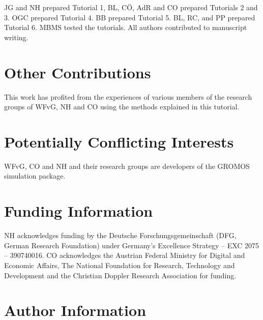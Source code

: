 \documentclass[9pt,tutorial,pubversion]{../includes/livecoms}
\newcommand{\githubrepository}{\url{https://github.com/biomos/gromos_tutorial_livecoms}}  %
\begin{document}
JG and NH prepared Tutorial 1, BL, C\"O, AdR and CO prepared Tutorials 2 and 3. OGC prepared Tutorial 4. BB prepared Tutorial 5. BL, RC, and PP prepared Tutorial 6. MBMS tested the tutorials. All authors contributed to manuscript writing.


\section{Other Contributions}

%
This work has profited from the experiences of various members of the research groups of  WFvG, NH and CO using the methods explained in this tutorial.


\section{Potentially Conflicting Interests}
WFvG, CO and NH and their research groups are developers of the GROMOS simulation package.

\section{Funding Information}
NH acknowledges funding by the Deutsche Forschungsgemeinschaft (DFG, German Research Foundation) under Germany’s Excellence Strategy – EXC 2075 – 390740016.
CO acknowledges the Austrian Federal Ministry for Digital and Economic Affairs, The National Foundation for Research, Technology and Development and the Christian Doppler Research Association for funding.

\section*{Author Information}
\makeorcid




\end{document}

